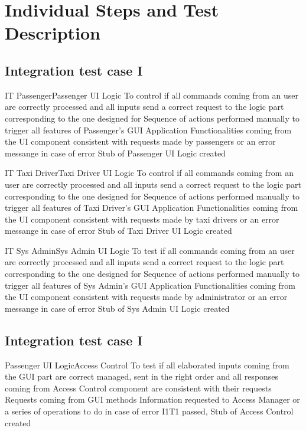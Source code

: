 \newpage
\section{Individual Steps and Test Description}

\subsection{Integration test case I}

\tctable
{IT}
{Passenger\textrightarrow Passenger UI Logic}
{To control if all commands coming from an user are correctly processed and all inputs send a correct request to the logic part corresponding to the one designed for}
{Sequence of actions performed manually to trigger all features of Passenger's GUI Application}
{Functionalities coming from the UI component consistent with requests made by passengers or an error messange in case of error}
{Stub of Passenger UI Logic created}

\vspace{2ex}
\tctable
{IT}
{Taxi Driver\textrightarrow Taxi Driver UI Logic}
{To control if all commands coming from an user are correctly processed and all inputs send a correct request to the logic part corresponding to the one designed for}
{Sequence of actions performed manually to trigger all features of Taxi Driver's GUI Application}
{Functionalities coming from the UI component consistent with requests made by taxi drivers or an error messange in case of error}
{Stub of Taxi Driver UI Logic created}

\vspace{2ex}
\tctable
{IT}
{Sys Admin\textrightarrow Sys Admin UI Logic}
{To test if all commands coming from an user are correctly processed and all inputs send a correct request to the logic part corresponding to the one designed for}
{Sequence of actions performed manually to trigger all features of Sys Admin's GUI Application}
{Functionalities coming from the UI component consistent with requests made by administrator or an error messange in case of error}
{Stub of Sys Admin UI Logic created}


\subsection{Integration test case I}
\setcounter{testcounter}{1}
{Passenger UI Logic\textrightarrow Access Control}
{To test if all elaborated inputs coming from the GUI part are correct managed, sent in the right order and all responses coming from Access Control component are consistent with their requests}
{Requests coming from GUI methods}
{Information requested to Access Manager or a series of operations to do in case of error}
{I1T1 passed, Stub of Access Control created}

